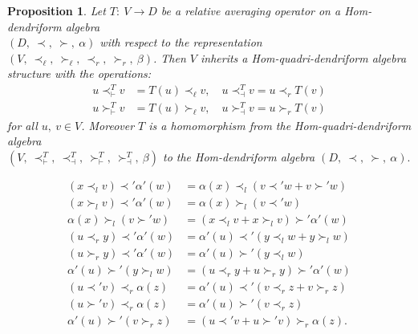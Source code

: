 \documentclass[10pt,a4paper]{amsart}
\newtheorem{proposition}{Proposition}
\begin{document}
\begin{proposition}\label{prop3.11}
Let  $T : \ V \to D$ be a relative averaging operator on a Hom-dendriform algebra \\$(D ,\ \prec,\  \succ ,\ \alpha)$ with respect to the representation $(V ,\  \prec_{\ell} ,\ \succ_{\ell},\  \prec_{r}  ,\ \succ_{r} ,\ \beta)$. Then $V$ inherits a Hom-quadri-dendriform algebra structure with the operations:
\begin{align*}
u \prec^{T}_{\vdash} v &= T(u) \prec_{\ell} v ,\quad u\prec^{T}_{\dashv} v = u \prec_{r} T(v) \\
u\succ^{T}_{\vdash} v &= T(u) \succ_{\ell} v ,\quad u \succ^{T}_{\dashv} v = u \succ_{r} T(v) 
\end{align*}
for all $u ,\ v \in V$.  Moreover  $T$  is  a  homomorphism from  the Hom-quadri-dendriform  algebra \\$(V ,\ \prec^{T}_{\vdash} ,\ \prec^{T}_{\dashv},\  \succ^{T}_{\vdash},\  \succ^{T}_{\dashv},\  \beta)$ to  the  Hom-dendriform algebra $(D ,\  \prec  ,\ \succ ,\ \alpha).$
\end{proposition}

\begin{align}
(x \prec_l v) \prec' \alpha'(w)& = \alpha(x) \prec_l (v \prec' w + v \succ' w) \label{eqtt}\\
(x \succ_l v) \prec' \alpha'(w)& = \alpha(x) \succ_l (v \prec' w) \label{rq2} \\
\alpha(x) \succ_l (v \succ' w)& = (x \prec_l v + x \succ_l v) \succ' \alpha'(w) \label{rq3}\\
(u \prec_r y) \prec' \alpha'(w)& = \alpha'(u) \prec' (y \prec_l w + y \succ_l w) \label{rq4} \\
(u \succ_r y) \prec' \alpha'(w)&= \alpha'(u) \succ' (y \prec_l w) \label{rq5}\\
\alpha'(u)\succ' (y \succ_l w)& = (u \prec_r y + u \succ_r y) \succ' \alpha'(w) \label{rq6}\\
(u \prec' v) \prec_r \alpha(z)& =\alpha'(u) \prec'  (v \prec_r z + v \succ_r z) \label{rq7}\\
(u \succ' v) \prec_r \alpha(z)&= \alpha'(u) \succ' (v \prec_r z) \label{rq8}\\
\alpha'(u) \succ' (v \succ_r z)&= (u \prec' v + u \succ' v) \succ_r \alpha(z).\label{eqttc}
\end{align}
\end{document}
